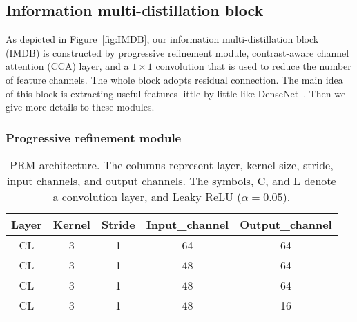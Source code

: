 \documentclass[sigconf]{acmart}
\begin{document}
\subsection{Information multi-distillation block}
As depicted in Figure~\ref{fig:IMDB}, our information multi-distillation block (IMDB) is constructed by progressive refinement module, contrast-aware channel attention (CCA) layer, and a $1 \times 1$ convolution that is used to reduce the number of feature channels. The whole block adopts residual connection. The main idea of this block is extracting useful features little by little like DenseNet~\cite{DenseNet}. Then we give more details to these modules.
\subsubsection{Progressive refinement module}
\begin{table}[htpb]
	\centering
	\small
	\caption{PRM architecture. The columns represent layer, kernel-size, stride, input channels, and output channels. The symbols, C, and L denote a convolution layer, and Leaky ReLU ($\alpha  = 0.05$).}
	\begin{tabular}{ccccc}
		\hline
		Layer & Kernel & Stride & Input\_channel & Output\_channel \\
		\hline
		CL & 3 & 1 & 64 & 64 \\
		CL & 3 & 1 & 48 & 64 \\
		CL & 3 & 1 & 48 & 64 \\
		CL & 3 & 1 & 48 & 16 \\
		\hline
	\end{tabular}
	\label{tab:prm}
\end{table}
\end{document}
